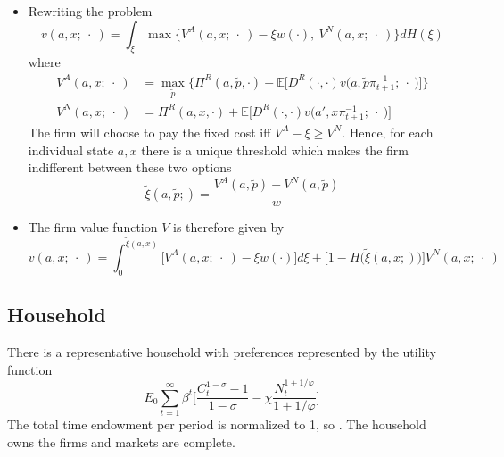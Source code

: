 \documentclass[a4paper,10pt]{article}  %
\begin{document}
\begin{itemize}
   \item Rewriting the problem
   \[
      v(a, x; \ \cdot \ ) = \int_{\xi} \max \Big\{ V^A(a,x; \ \cdot \ ) - \xi w(\cdot) , \ V^N(a,x ; \ \cdot \ )  \Big\} dH(\xi )
   \]
   where
   \begin{equation}
      \label{eq:model_eq4}
      \begin{split}
      V^A(a, x; \ \cdot \ ) & = \max_{\tilde{p}} 
         \Bigg\{ 
            \Pi^R \left( a, \tilde{p}, \cdot \right) + 
            \mathbb{E} \bigg[ D^R(\cdot,\cdot) v\Big( a,\tilde{p} \pi_{t+1}^{-1} ; \ \cdot \ \Big) \bigg]
         \Bigg\} \\
      V^N(a, x; \ \cdot \ ) & = 
          \Pi^R \left( a, x, \cdot \right) + \mathbb{E}
          \Big[ 
               D^R(\cdot,\cdot) v\Big( a', x\pi_{t+1}^{-1} ; \ \cdot \  \Big)
          \Big]
      \end{split}
   \end{equation}
   The firm will choose to pay the fixed cost iff $ V^A -\xi \ge V^N $. Hence, for 
   each individual state $ a, x $ there is a unique threshold which makes the firm 
   indifferent between these two options
   \[
      \tilde{\xi}(a, \tilde{p} ; ) = \frac{V^A(a, \tilde{p} ) - V^N( a, \tilde{p})}{w}
   \]

   \item The firm value function $V$ is therefore given by
   \begin{equation}
      v(a, x; \ \cdot \ ) = 
         \int_0^{ \tilde{\xi}(a,x ) } 
         \Big[ 
            V^A(a, x ; \ \cdot \ ) - \xi w(\cdot) 
         \Big]d\xi  
         + \Big[  1 - H\Big( \tilde{\xi}(a, x ; ) \Big) \Big] V^N(a,x ; \ \cdot \ )
   \end{equation}
\end{itemize}

\subsection{Household} %
\label{sub:household}

There is a representative household with preferences represented by the utility function
\begin{equation}
   \label{eq:utility}
   E_0 \sum_{t=1}^{\infty} \beta^t \bigg[ \frac{ C_t^{1-\sigma} -1}{ 1-\sigma } - \chi \frac{ N_t^{1+ 1/\varphi} }{ 1+ 1/\varphi } \bigg]   
\end{equation}
The total time endowment per period is normalized to 1, so . 
The household owns the firms and markets are complete. 
\end{document}
